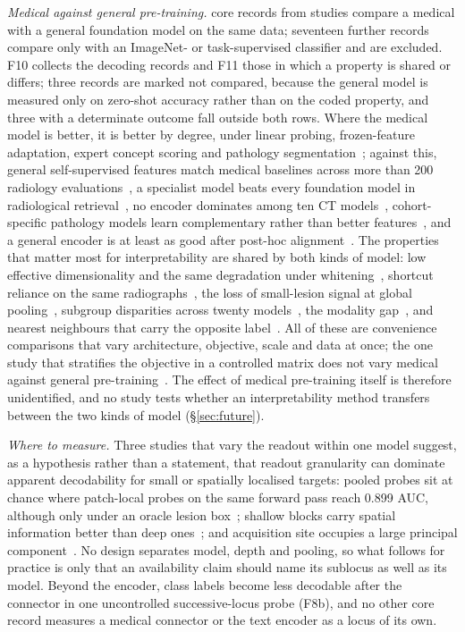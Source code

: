 \emph{Medical against general pre-training.} \Nmvgrec{} core records from \Nmvgstud{} studies compare a
medical with a general foundation model on the same data; seventeen further records compare only with
an ImageNet- or task-supervised classifier and are excluded. F10 collects the decoding records and F11
those in which a property is shared or differs; three records are marked not compared, because the
general model is measured only on zero-shot accuracy rather than on the coded property, and three with
a determinate outcome fall outside both rows. Where the medical model is better, it is better by degree,
under linear probing, frozen-feature adaptation, expert concept scoring and pathology
segmentation~\cite{li2025featurequality,germani2025bias,zhou2025generalist,kim2024transparent,song2024morphological,gildenblat2024segmentation,cui2026translating};
against this, general self-supervised features match medical baselines across more than 200 radiology
evaluations~\cite{baharoon2023dinov2}, a specialist model beats every foundation model in radiological
retrieval~\cite{denner2024leveraging}, no encoder dominates among ten CT
models~\cite{chevli2026frozenct}, cohort-specific pathology models learn complementary rather than
better features~\cite{neidlinger2025benchmark}, and a general encoder is at least as good after
post-hoc alignment~\cite{folco2025semantic,wesp2026sparse}. The properties that matter most for
interpretability are shared by both kinds of model: low effective dimensionality and the same
degradation under whitening~\cite{garciahidalgo2026embedding}, shortcut reliance on the same
radiographs~\cite{li2025featurequality,sourget2025fairness}, the loss of small-lesion signal at global
pooling~\cite{muthyala2026frozen}, subgroup disparities across twenty models~\cite{jin2024fairmedfm},
the modality gap~\cite{restrepo2026cone}, and nearest neighbours that carry the opposite
label~\cite{arasteh2026candor}. All of these are convenience comparisons that vary architecture,
objective, scale and data at once; the one study that stratifies the objective in a controlled matrix
does not vary medical against general pre-training~\cite{tayebiarasteh2026self}. The effect of medical
pre-training itself is therefore unidentified, and no study tests whether an interpretability method
transfers between the two kinds of model (\S\ref{sec:future}).

\emph{Where to measure.} Three studies that vary the readout within one model suggest, as a hypothesis
rather than a statement, that readout granularity can dominate apparent decodability for small or
spatially localised targets: pooled probes sit at chance where patch-local probes on the same forward
pass reach 0.899 AUC, although only under an oracle lesion box~\cite{muthyala2026frozen}; shallow blocks
carry spatial information better than deep ones~\cite{vadori2025mind}; and acquisition site occupies a
large principal component~\cite{rahbar2026frozen}. No design separates model, depth and pooling, so
what follows for practice is only that an availability claim should name its sublocus as well as its
model. Beyond the encoder, class labels become less decodable after the connector in one uncontrolled
successive-locus probe (F8b), and no other core record measures a medical connector or the text encoder
as a locus of its own.
